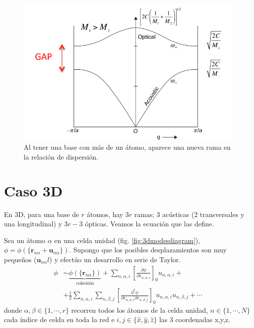 \begin{figure}
  \centering
  \includegraphics[width=\textwidth]{figures/twobranches.png}
  \caption{Al tener una base con más de un átomo, aparece una nueva
    rama en la relación de dispersión.}
  \label{fig:twobranches}
\end{figure}

\section{Caso 3D}
En 3D, para una base de $r$ átomos, hay $3r$ ramas; 3 acústicas
(2 transversales y una longitudinal) y $3r-3$ ópticas. Veamos la
ecuación que las define.

Sea un átomo $\alpha$ en una celda unidad
(fig. \ref{fig:3dmodesdiagram}), $\phi = \phi(\{\mathbf{r}_{n\alpha} +
\mathbf{u}_{n\alpha}\})$. Supongo que los posibles
desplazamientos son muy pequeños ($\mathbf{u}_{n\alpha} l$) y efectúo
un desarrollo en serie de Taylor.
\begin{equation}
\begin{split}
  \phi &\sim
  \underbrace{\phi(\{\mathbf{r}_{n\alpha}\})}_{\text{cohesión}} +
  \sum_{n,\alpha,i} \left[  \frac{\partial \phi}{\partial
      r_{n,\alpha,i}}\right] _0 u_{n,\alpha, i} + \\ &+ \frac{1}{2}
  \sum_{n,\alpha,i} \sum_{n,\beta,j} \left[  \frac{\partial ^2
      \phi}{\partial r_{n,\alpha,i} \partial r_{n,\beta,j}}\right]_0
  u_{n,\alpha,i} u_{n,\beta,j} + \cdots
\end{split}
\end{equation}
donde $\alpha, \beta \in \{1, \cdots, r\}$ recorren todos los átomos de la celda unidad,
$n \in \{ 1, \cdots , N\}$ cada índice de celda en toda la red e $i,j \in \{ \hat x, \hat y, \hat z \}$ las 3 coordenadas x,y,z.

